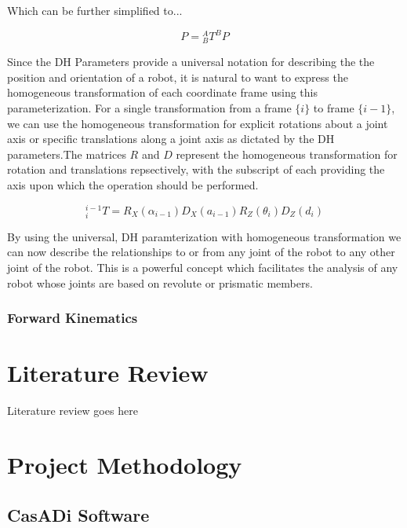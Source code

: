 \documentclass[journal]{IEEEtran}
\begin{document}
Which can be further simplified to...

$$
P={ }_{B}^{A} T^{B} P
$$

Since the DH Parameters provide a universal notation for describing the the position and orientation of a robot, it is natural to want to express the homogeneous transformation of each coordinate frame using this parameterization. For a single transformation from a frame $\{ i\}$ to frame $\{ i-1 \}$, we can use the homogeneous transformation for explicit rotations about a joint axis or specific translations along a joint axis as dictated by the DH parameters.The matrices $R$ and $D$ represent the homogeneous transformation for rotation and translations repsectively, with the subscript of each providing the axis upon which the operation should be performed.

$$
{ }_{i}^{i-1} T=R_{X}\left(\alpha_{i-1}\right) D_{X}\left(a_{i-1}\right) R_{Z}\left(\theta_{i}\right) D_{Z}\left(d_{i}\right)
$$


By using the universal, DH paramterization with homogeneous transformation we can now describe the relationships to or from any joint of the robot to any other joint of the robot. This is a powerful concept which facilitates the analysis of any robot whose joints are based on revolute or prismatic members.





\subsubsection{Forward Kinematics}

\section{Literature Review}
Literature review goes here




\section{Project Methodology}

\subsection{CasADi Software}

\subsection{}
\end{document}
